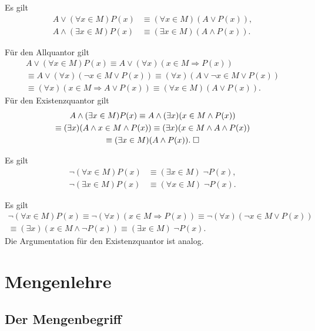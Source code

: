 \begin{Satz}
Es gilt
\begin{align*}
A\lor (\forall x\in M)P(x) &\equiv (\forall x\in M)(A\lor P(x)),\\
A\land(\exists x\in M)P(x) &\equiv (\exists x\in M)(A\land P(x)).
\end{align*}
\end{Satz}
 Für den Allquantor gilt
\begin{gather}
A\lor (\forall x\in M)P(x)
\equiv A\lor(\forall x)(x\in M\Rightarrow P(x))\\
\equiv A\lor(\forall x)(\neg x\in M\lor P(x))
\equiv (\forall x)(A\lor\neg x\in M\lor P(x))\\
\equiv (\forall x)(x\in M\Rightarrow A\lor P(x))
\equiv (\forall x\in M)(A\lor P(x)).
\end{gather}
Für den Existenzquantor gilt
\begin{gather}
A\land (\exists x\in M)P(x)
\equiv A\land(\exists x)(x\in M\land P(x))\\
\equiv (\exists x)(A\land x\in M\land P(x))
\equiv (\exists x)(x\in M\land A\land P(x))\\
\equiv (\exists x\in M)(A\land P(x)).\;\Box
\end{gather}

\begin{Satz}
Es gilt
\begin{align*}
\neg (\forall x\in M)P(x) &\equiv (\exists x\in M)\;\neg P(x),\\
\neg (\exists x\in M)P(x) &\equiv (\forall x\in M)\;\neg P(x).
\end{align*}
\end{Satz}
 Es gilt
\begin{gather}
\neg(\forall x\in M)P(x) \equiv \neg(\forall x)(x\in M\Rightarrow P(x))
\equiv \neg(\forall x)(\neg x\in M\lor P(x))\\
\equiv (\exists x)(x\in M\land \neg P(x))
\equiv (\exists x\in M)\;\neg P(x).
\end{gather}
Die Argumentation für den Existenzquantor ist analog.\;\qedsymbol

\newpage
\section{Mengenlehre}

\subsection{Der Mengenbegriff}

